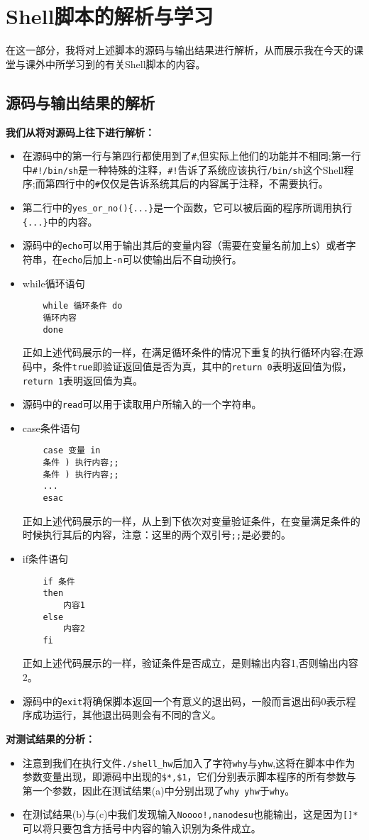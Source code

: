\documentclass[UTF8]{ctexart}
\begin{document}
\section{Shell脚本的解析与学习}
在这一部分，我将对上述脚本的源码与输出结果进行解析，从而展示我在今天的课堂与课外中所学习到的有关Shell脚本的内容。
\subsection{源码与输出结果的解析}
{\bf 我们从将对源码上往下进行解析：}
\begin{itemize}
\item 在源码中的第一行与第四行都使用到了\verb|#|,但实际上他们的功能并不相同;第一行中\verb|#!/bin/sh|是一种特殊的注释，\verb|#!|告诉了系统应该执行\verb|/bin/sh|这个Shell程序;而第四行中的\verb|#|仅仅是告诉系统其后的内容属于注释，不需要执行。
\item 第二行中的\verb|yes_or_no(){...}|是一个函数，它可以被后面的程序所调用执行\verb|{...}|中的内容。
\item 源码中的\verb|echo|可以用于输出其后的变量内容（需要在变量名前加上\verb|$|）或者字符串，在\verb|echo|后加上\verb|-n|可以使输出后不自动换行。
\item while循环语句
\begin{verbatim}
	while 循环条件 do
	循环内容
	done
\end{verbatim}
正如上述代码展示的一样，在满足循环条件的情况下重复的执行循环内容;在源码中，条件\verb|true|即验证返回值是否为真，其中的\verb|return 0|表明返回值为假，\verb|return 1|表明返回值为真。
\item 源码中的\verb|read|可以用于读取用户所输入的一个字符串。
\item case条件语句
\begin{verbatim}
	case 变量 in
	条件 ) 执行内容;;
	条件 ) 执行内容;;
	...
	esac
\end{verbatim}
正如上述代码展示的一样，从上到下依次对变量验证条件，在变量满足条件的时候执行其后的内容，注意：这里的两个双引号\verb|;;|是必要的。
\item if条件语句
\begin{verbatim}
	if 条件
	then
		内容1
	else
		内容2
	fi
\end{verbatim}
正如上述代码展示的一样，验证条件是否成立，是则输出内容1,否则输出内容2。
\item 源码中的\verb|exit|将确保脚本返回一个有意义的退出码，一般而言退出码0表示程序成功运行，其他退出码则会有不同的含义。
\end{itemize}

{\bf 对测试结果的分析：}
\begin{itemize}
\item 注意到我们在执行文件\verb|./shell_hw|后加入了字符\verb|why|与\verb|yhw|,这将在脚本中作为参数变量出现，即源码中出现的\verb|$*,$1|，它们分别表示脚本程序的所有参数与第一个参数，因此在测试结果(a)中分别出现了\verb|why yhw|于\verb|why|。
\item 在测试结果(b)与(c)中我们发现输入\verb|Noooo!,nanodesu|也能输出，这是因为\verb|[]*|可以将只要包含方括号中内容的输入识别为条件成立。
\end{itemize}
\end{document}
